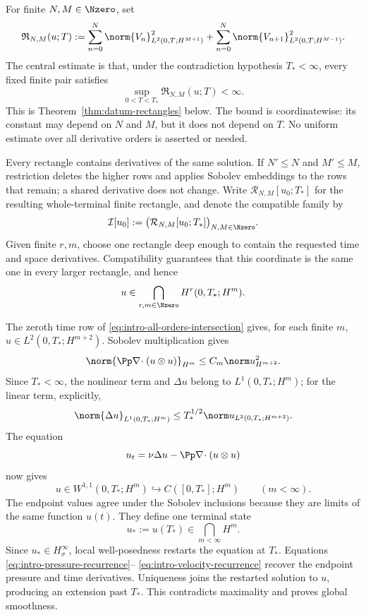 For finite \(N,M\in\Nzero\), set
\begin{equation}
 \mathfrak R_{N,M}(u;T)
 :=\sum_{n=0}^{N}\norm{V_n}_{L^2(0,T;H^{M+1})}^2
 +\sum_{n=0}^{N}\norm{V_{n+1}}_{L^2(0,T;H^{M-1})}^2.
 \label{eq:intro-rectangle-norm}
\end{equation}
The central estimate is that, under the contradiction hypothesis
\(T_*<\infty\), every fixed finite pair satisfies
\begin{equation}
 \sup_{0<T<T_*}\mathfrak R_{N,M}(u;T)<\infty.
 \label{eq:intro-terminal-rectangle}
\end{equation}
This is Theorem~\ref{thm:datum-rectangles} below.
The bound is coordinatewise: its constant may depend on \(N\) and \(M\), but
it does not depend on \(T\).  No uniform estimate over all derivative orders
is asserted or needed.

Every rectangle contains derivatives of the same solution.  If
\(N'\le N\) and \(M'\le M\), restriction deletes the higher rows and applies
Sobolev embeddings to the rows that remain; a shared derivative does not
change.  Write \(\mathcal R_{N,M}[u_0;T_*]\) for the resulting whole-terminal
finite rectangle, and denote the compatible family by
\begin{equation}
 \mathcal I[u_0]
 :=\bigl(\mathcal R_{N,M}[u_0;T_*]\bigr)_{N,M\in\Nzero}.
 \label{eq:intro-compatible-intersection}
\end{equation}
Given finite \(r,m\), choose one rectangle deep enough to contain the
requested time and space derivatives.  Compatibility guarantees that this
coordinate is the same one in every larger rectangle, and hence
\begin{equation}
 u\in\bigcap_{r,m\in\Nzero}H^r(0,T_*;H^m).
 \label{eq:intro-all-orders-intersection}
\end{equation}

The zeroth time row of \eqref{eq:intro-all-orders-intersection} gives, for
each finite \(m\), \(u\in L^2(0,T_*;H^{m+2})\).  Sobolev multiplication gives
\[
 \norm{\Pp\nabla\!\cdot(u\otimes u)}_{H^m}
 \le C_m\norm u_{H^{m+2}}^2.
\]
Since \(T_*<\infty\), the nonlinear term and \(\Delta u\) belong to
\(L^1(0,T_*;H^m)\); for the linear term, explicitly,
\[
 \norm{\Delta u}_{L^1(0,T_*;H^m)}
 \le T_*^{1/2}\norm u_{L^2(0,T_*;H^{m+2})}.
\]
The equation
\[
 u_t=\nu\Delta u-\Pp\nabla\!\cdot(u\otimes u)
\]
now gives
\[
 u\in W^{1,1}(0,T_*;H^m)
 \hookrightarrow C([0,T_*];H^m)
 \qquad(m<\infty).
\]
The endpoint values agree under the Sobolev inclusions because they are limits
of the same function \(u(t)\).  They define one terminal state
\[
 u_*:=u(T_*)\in\bigcap_{m<\infty}H^m.
\]
Since \(u_*\in H^\infty_\sigma\), local well-posedness restarts the equation
at \(T_*\).  Equations \eqref{eq:intro-pressure-recurrence}--
\eqref{eq:intro-velocity-recurrence} recover the endpoint pressure and time
derivatives.  Uniqueness joins the restarted solution to \(u\), producing an
extension past \(T_*\).  This contradicts maximality and proves global
smoothness.

\clearpage
